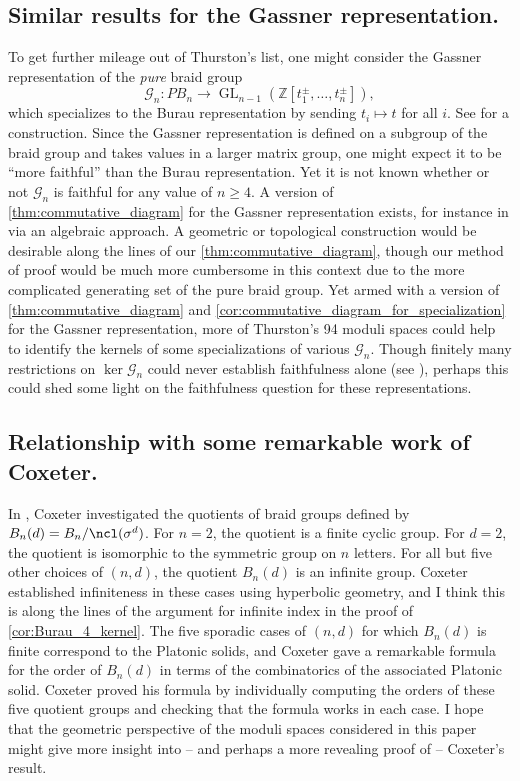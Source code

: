 \documentclass{amsart}
\begin{document}
    \subsection*{Similar results for the Gassner representation.} To get further mileage out of Thurston's list, one might consider the Gassner representation of the \textit{pure} braid group
    $$\mathcal{G}_n:PB_n \to \operatorname{GL}_{n-1}(\mathbb{Z}[t_1^\pm,\dotsc,t_n^\pm]),$$
    which specializes to the Burau representation by sending $t_i \mapsto t$ for all $i$. See \cite[Chapter 3]{Birman1975BraidsAM-82} for a construction. Since the Gassner representation is defined on a subgroup of the braid group and takes values in a larger matrix group, one might expect it to be ``more faithful'' than the Burau representation. Yet it is not known whether or not $\mathcal{G}_n$ is faithful for any value of $n \geq 4$. A version of  \cref{thm:commutative_diagram} for the Gassner representation exists, for instance in \cite{Venkataramana2014MonodromyLine} via an algebraic approach. A geometric or topological construction would be desirable along the lines of our \cref{thm:commutative_diagram}, though our method of proof would be much more cumbersome in this context due to the more complicated generating set of the pure braid group. Yet armed with a version of \cref{thm:commutative_diagram} and \cref{cor:commutative_diagram_for_specialization} for the Gassner representation, more of Thurston's 94 moduli spaces could help to identify the kernels of some specializations of various $\mathcal G_n$. Though finitely many restrictions on $\ker \mathcal G_n$ could never establish faithfulness alone (see \cite[Lemma 2.1]{Long1986AGroups}), perhaps this could shed some light on the faithfulness question for these representations.

    \subsection*{Relationship with some remarkable work of Coxeter.} In \cite{Coxeter1959FactorGroup}, Coxeter investigated the quotients of braid groups defined by $B_n(d) = B_n/\ncl(\sigma^d)$. For $n=2$, the quotient is a finite cyclic group. For $d=2$, the quotient is isomorphic to the symmetric group on $n$ letters. For all but five other choices of $(n,d)$, the quotient $B_n(d)$ is an infinite group. Coxeter established infiniteness in these cases using hyperbolic geometry, and I think this is along the lines of the argument for infinite index in the proof of \cref{cor:Burau_4_kernel}. The five sporadic cases of $(n,d)$ for which $B_n(d)$ is finite correspond to the Platonic solids, and Coxeter gave a remarkable formula for the order of $B_n(d)$ in terms of the combinatorics of the associated Platonic solid. Coxeter proved his formula by individually computing the orders of these five quotient groups and checking that the formula works in each case. I hope that the geometric perspective of the moduli spaces considered in this paper might give more insight into -- and perhaps a more revealing proof of -- Coxeter's result.

    

\end{document}
